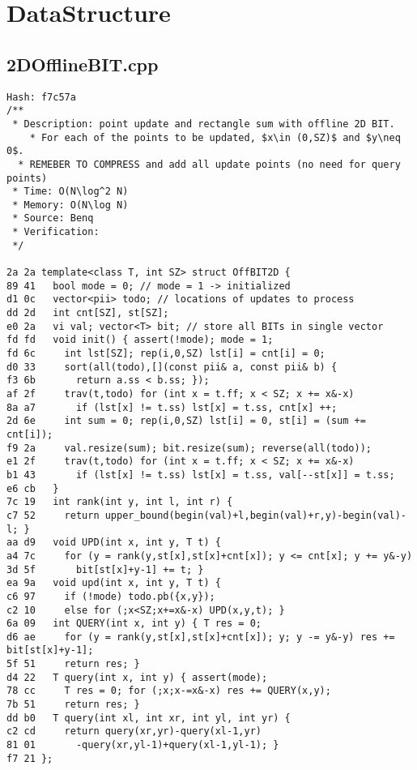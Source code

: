 \documentclass[11pt, a4paper, twoside]{article}
\begin{document}
%
%

\section{DataStructure}

\subsection{2DOfflineBIT.cpp}
\begin{lstlisting}
Hash: f7c57a
/**
 * Description: point update and rectangle sum with offline 2D BIT. 
	* For each of the points to be updated, $x\in (0,SZ)$ and $y\neq 0$.
  * REMEBER TO COMPRESS and add all update points (no need for query points)
 * Time: O(N\log^2 N)
 * Memory: O(N\log N)
 * Source: Benq
 * Verification: 
 */

2a 2a template<class T, int SZ> struct OffBIT2D { 
89 41   bool mode = 0; // mode = 1 -> initialized
d1 0c   vector<pii> todo; // locations of updates to process
dd 2d   int cnt[SZ], st[SZ];
e0 2a   vi val; vector<T> bit; // store all BITs in single vector
fd fd   void init() { assert(!mode); mode = 1;
fd 6c     int lst[SZ]; rep(i,0,SZ) lst[i] = cnt[i] = 0;
d0 33     sort(all(todo),[](const pii& a, const pii& b) { 
f3 6b       return a.ss < b.ss; });
af 2f     trav(t,todo) for (int x = t.ff; x < SZ; x += x&-x) 
8a a7       if (lst[x] != t.ss) lst[x] = t.ss, cnt[x] ++;
2d 6e     int sum = 0; rep(i,0,SZ) lst[i] = 0, st[i] = (sum += cnt[i]);
f9 2a     val.resize(sum); bit.resize(sum); reverse(all(todo));
e1 2f     trav(t,todo) for (int x = t.ff; x < SZ; x += x&-x) 
b1 43       if (lst[x] != t.ss) lst[x] = t.ss, val[--st[x]] = t.ss;
e6 cb   }
7c 19   int rank(int y, int l, int r) {
c7 52     return upper_bound(begin(val)+l,begin(val)+r,y)-begin(val)-l; }
aa d9   void UPD(int x, int y, T t) {
a4 7c     for (y = rank(y,st[x],st[x]+cnt[x]); y <= cnt[x]; y += y&-y) 
3d 5f       bit[st[x]+y-1] += t; }
ea 9a   void upd(int x, int y, T t) { 
c6 97     if (!mode) todo.pb({x,y});
c2 10     else for (;x<SZ;x+=x&-x) UPD(x,y,t); }
6a 09   int QUERY(int x, int y) { T res = 0;
d6 ae     for (y = rank(y,st[x],st[x]+cnt[x]); y; y -= y&-y) res += bit[st[x]+y-1];
5f 51     return res; }
d4 22   T query(int x, int y) { assert(mode);
78 cc     T res = 0; for (;x;x-=x&-x) res += QUERY(x,y);
7b 51     return res; }
dd b0   T query(int xl, int xr, int yl, int yr) { 
c2 cd     return query(xr,yr)-query(xl-1,yr)
81 01       -query(xr,yl-1)+query(xl-1,yl-1); }
f7 21 };
\end{lstlisting}
\end{document}
